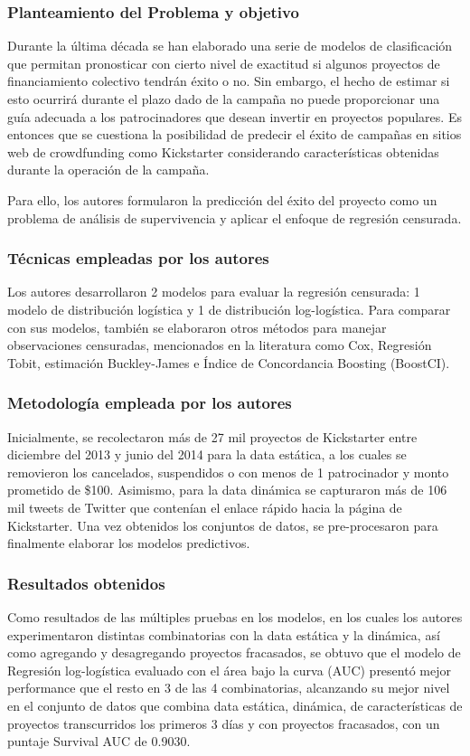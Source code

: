 \subsubsection{Planteamiento del Problema y objetivo}
Durante la última década se han elaborado una serie de modelos de clasificación que permitan pronosticar con cierto nivel de exactitud si algunos proyectos de financiamiento colectivo tendrán éxito o no. Sin embargo, el hecho de estimar si esto ocurrirá durante el plazo dado de la campaña no puede proporcionar una guía adecuada a los patrocinadores que desean invertir en proyectos populares. Es entonces que se cuestiona la posibilidad de predecir el éxito de campañas en sitios web de crowdfunding como Kickstarter considerando características obtenidas durante la operación de la campaña.

Para ello, los autores formularon la predicción del éxito del proyecto como un problema de análisis de supervivencia y aplicar el enfoque de regresión censurada.

\subsubsection{Técnicas empleadas por los autores}
Los autores desarrollaron 2 modelos para evaluar la regresión censurada: 1 modelo de distribución logística y 1 de distribución log-logística. Para comparar con sus modelos, también se elaboraron otros métodos para manejar observaciones censuradas, mencionados en la literatura como Cox, Regresión Tobit, estimación Buckley-James e Índice de Concordancia Boosting (BoostCI).

\subsubsection{Metodología empleada por los autores}
Inicialmente, se recolectaron más de 27 mil proyectos de Kickstarter entre diciembre del 2013 y junio del 2014 para la data estática, a los cuales se removieron los cancelados, suspendidos o con menos de 1 patrocinador y monto prometido de \$100. Asimismo, para la data dinámica se capturaron más de 106 mil tweets de Twitter que contenían el enlace rápido hacia la página de Kickstarter. Una vez obtenidos los conjuntos de datos, se pre-procesaron para finalmente elaborar los modelos predictivos.

\subsubsection{Resultados obtenidos}
Como resultados de las múltiples pruebas en los modelos, en los cuales los autores experimentaron distintas combinatorias con la data estática y la dinámica, así como agregando y desagregando proyectos fracasados, se obtuvo que el modelo de Regresión log-logística evaluado con el área bajo la curva (AUC) presentó mejor performance que el resto en 3 de las 4 combinatorias, alcanzando su mejor nivel en el conjunto de datos que combina data estática, dinámica, de características de proyectos transcurridos los primeros 3 días y con proyectos fracasados, con un puntaje Survival AUC de 0.9030.


